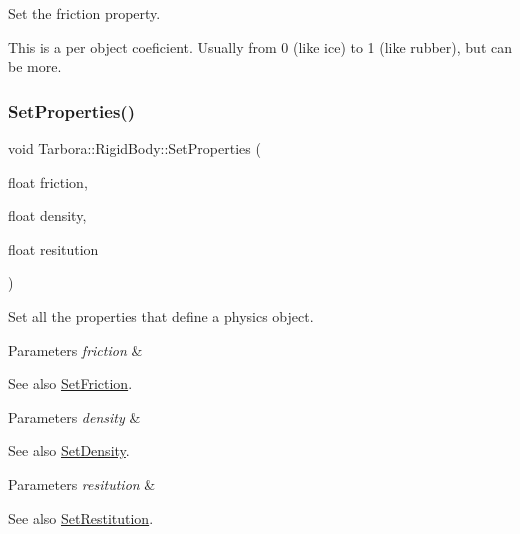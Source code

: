 Set the friction property. 

This is a per object coeficient. Usually from 0 (like ice) to 1 (like rubber), but can be more. \mbox{\label{classTarbora_1_1RigidBody_a0ec675847bf2c6e5f34002eab0c29ef0}} 
\subsubsection{\texorpdfstring{Set\+Properties()}{SetProperties()}}
{\footnotesize\ttfamily void Tarbora\+::\+Rigid\+Body\+::\+Set\+Properties (\begin{DoxyParamCaption}\item[{float}]{friction,  }\item[{float}]{density,  }\item[{float}]{resitution }\end{DoxyParamCaption})}



Set all the properties that define a physics object. 


\begin{DoxyParams}{Parameters}
{\em friction} & \\
\hline
\end{DoxyParams}
\begin{DoxySeeAlso}{See also}
\hyperlink{classTarbora_1_1RigidBody_a9408bdeb536881e29f3706bb061220d2}{Set\+Friction}. 
\end{DoxySeeAlso}

\begin{DoxyParams}{Parameters}
{\em density} & \\
\hline
\end{DoxyParams}
\begin{DoxySeeAlso}{See also}
\hyperlink{classTarbora_1_1RigidBody_a154ac3b0b5f1e6da32ee6e02b65822d8}{Set\+Density}. 
\end{DoxySeeAlso}

\begin{DoxyParams}{Parameters}
{\em resitution} & \\
\hline
\end{DoxyParams}
\begin{DoxySeeAlso}{See also}
\hyperlink{classTarbora_1_1RigidBody_a60ba7ea96ffada37237ce4345b58eb23}{Set\+Restitution}. 
\end{DoxySeeAlso}
\mbox{\label{classTarbora_1_1RigidBody_a60ba7ea96ffada37237ce4345b58eb23}} 
